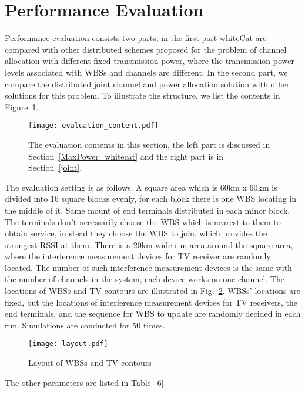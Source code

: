 \section{Performance Evaluation}
\label{simulation}
Performance evaluation consists two parts, in the first part whiteCat are compared with other distributed schemes proposed for the problem of channel allocation with different fixed transmission power, where the transmission power levels associated with WBSs and channels are different.
In the second part, we compare the distributed joint channel and power allocation solution with other solutions for this problem.
To illustrate the structure, we list the contents in Figure~\ref{evaluationContent}.

\begin{figure}[h!]
  \centering
  \texttt{[image: evaluation\_content.pdf]}
  \caption{The evaluation contents in this section, the left part is discussed in Section~\ref{MaxPower_whitecat} and the right part is in Section~\ref{joint}. 	}
\label{evaluationContent}
\end{figure}

The evaluation setting is as follows.
A square area which is 60km x 60km is divided into 16 square blocks evenly, for each block there is one WBS locating in the middle of it. 
Same mount of end terminals distributed in each minor block.
The terminals don't necessarily choose the WBS which is nearest to them to obtain service, in stead they choose the WBS to join, which provides the strongest \gls{RSSI} at them.
There is a 20km wide rim area around the square area, where the interference measurement devices for TV receiver are randomly located.
The number of such interference measurement devices is the same with the number of channels in the system, each device works on one channel.
The locations of WBSs and TV contours are illustrated in Fig.~\ref{sim:layout}.
WBSs' locations are fixed, but the locations of interference measurement devices for TV receivers, the end terminals, and the sequence for WBS to update are randomly decided in each run.
Simulations are conducted for 50 times.

\begin{figure}[h!]
  \centering
  \texttt{[image: layout.pdf]}
  \caption{Layout of WBSs and TV contours}
  \label{sim:layout}
\end{figure}

The other parameters are listed in Table~\ref{6}.

